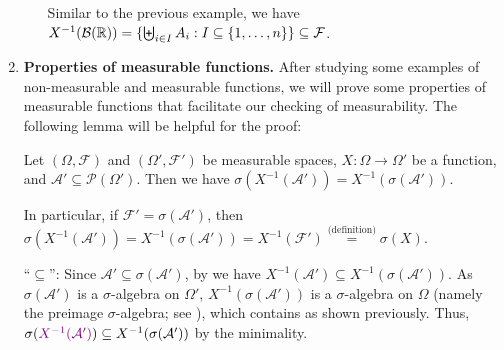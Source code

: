 \begin{enumerate}
\begin{enumerate}[label={(\arabic*)}]
\begin{pf}
Similar to the previous example, we have
\(X^{-1}(\mathcal{B}(\mathbb{R}))=\{\biguplus_{i\in I}^{}A_i:I\subseteq
\{1,\dotsc,n\}\}\subseteq \mathcal{F}\).
\end{pf}
\end{enumerate}
\item \textbf{Properties of measurable functions.} After studying some examples
of non-measurable and measurable functions, we will prove some properties of
measurable functions that facilitate our checking of measurability. The
following lemma will be helpful for the proof:
\begin{lemma}
\label{lma:sig-alg-gen-preimg-comm}
Let \((\Omega,\mathcal{F})\) and \((\Omega',\mathcal{F}')\) be measurable
spaces, \(X:\Omega\to\Omega'\) be a function, and \(\mathcal{A}'\subseteq
\mathcal{P}(\Omega')\). Then we have
\(\sigma(X^{-1}(\mathcal{A}'))=X^{-1}(\sigma(\mathcal{A}'))\).
\begin{note}
In particular, if \(\mathcal{F}'=\sigma(\mathcal{A}')\), then
\(\sigma(X^{-1}(\mathcal{A}'))
=X^{-1}(\sigma(\mathcal{A}'))=X^{-1}(\mathcal{F}')\overset{\text{(definition)}}{=}\sigma(X)\).
\end{note}
\end{lemma}
\begin{pf}
``\(\subseteq\)'': Since \(\mathcal{A}'\subseteq \sigma(\mathcal{A}')\), by
 we have \(X^{-1}(\mathcal{A}')\subseteq
X^{-1}(\sigma(\mathcal{A}'))\).  As \(\sigma(\mathcal{A}')\) is a
\(\sigma\)-algebra on \(\Omega'\), \(X^{-1}(\sigma(\mathcal{A}'))\) is a
\(\sigma\)-algebra on \(\Omega\) (namely the preimage \(\sigma\)-algebra; see
), which contains  as
shown previously. Thus, \(\sigma(\vc{X^{-1}(\mathcal{A}')})\subseteq X^{-1}(\sigma(\mathcal{A}'))\)
by the minimality.


\end{pf}
\end{enumerate}
